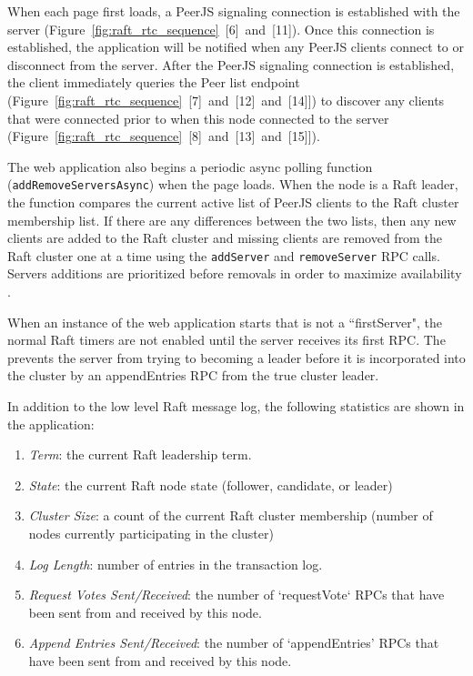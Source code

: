 \documentclass[9pt]{extarticle}
\begin{document}
\begin{multicols}{2}
When each page first loads, a PeerJS signaling connection is
established with the server
(Figure~\ref{fig:raft_rtc_sequence}~[6]~and~[11]). Once this
connection is established, the application will be notified when any
PeerJS clients connect to or disconnect from the server.  After the
PeerJS signaling connection is established, the client immediately
queries the Peer list endpoint
(Figure~\ref{fig:raft_rtc_sequence}~[7]~and~[12]~and~[14]]) to discover
any clients that were connected prior to when this node connected to
the server (Figure~\ref{fig:raft_rtc_sequence}~[8]~and~[13]~and~[15]]).

The web application also begins a periodic async polling function
(\texttt{addRemoveServersAsync}) when the page loads. When the node is a Raft
leader, the function compares the current active list of PeerJS clients to
the Raft cluster membership list. If there are any differences between
the two lists, then any new clients are added to the Raft cluster and
missing clients are removed from the Raft cluster one at a time using
the \texttt{addServer} and \texttt{removeServer} RPC calls. Servers
additions are prioritized before removals 
in order to maximize availability
\cite[Section~4.4]{raft_thesis:ongaro14}.

When an instance of the web application starts that is not
a ``firstServer", the normal Raft timers are not enabled until the
server receives its first RPC. The prevents the server from
trying to becoming a leader before it is incorporated into the cluster
by an appendEntries RPC from the true cluster leader.

In addition to the low level Raft message log, the following
statistics are shown in the application:

\begin{enumerate}
\item \emph{Term}: the current Raft leadership term.
\item \emph{State}: the current Raft node state (follower, candidate,
    or leader)
\item \emph{Cluster Size}: a count of the current Raft cluster
    membership (number of nodes currently participating in the
    cluster)
\item \emph{Log Length}: number of entries in the transaction log.
\item \emph{Request Votes Sent/Received}: the number of `requestVote`
    RPCs that have been sent from and received by this node.
\item \emph{Append Entries Sent/Received}: the number of
    `appendEntries' RPCs that have been sent from and received by this
    node.
\end{enumerate}


\end{multicols}
\end{document}
